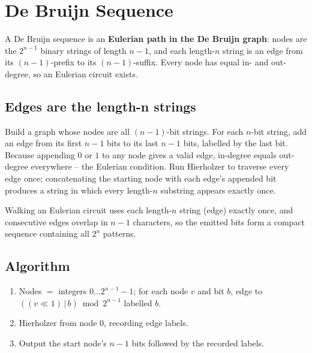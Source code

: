 \section{De Bruijn Sequence}
\label{sec:cses-de-bruijn-sequence}


\begin{patternbox}
A De Bruijn sequence is an \textbf{Eulerian path in the De Bruijn graph}:
nodes are the $2^{n-1}$ binary strings of length $n-1$, and each length-$n$
string is an edge from its $(n-1)$-prefix to its $(n-1)$-suffix. Every node
has equal in- and out-degree, so an Eulerian circuit exists.
\end{patternbox}

\subsection*{Edges are the length-n strings}

Build a graph whose nodes are all $(n-1)$-bit strings. For each $n$-bit
string, add an edge from its first $n-1$ bits to its last $n-1$ bits,
labelled by the last bit. Because appending $0$ or $1$ to any node gives a
valid edge, in-degree equals out-degree everywhere -- the Eulerian
condition. Run Hierholzer to traverse every edge once; concatenating the
starting node with each edge's appended bit produces a string in which every
length-$n$ substring appears exactly once.

\begin{ideabox}
Walking an Eulerian circuit uses each length-$n$ string (edge) exactly once,
and consecutive edges overlap in $n-1$ characters, so the emitted bits form
a compact sequence containing all $2^n$ patterns.
\end{ideabox}

\subsection*{Algorithm}

\begin{enumerate}
  \item Nodes $=$ integers $0\ldots2^{n-1}-1$; for each node $v$ and bit
        $b$, edge to $((v\ll1)\,|\,b)\bmod 2^{n-1}$ labelled $b$.
  \item Hierholzer from node $0$, recording edge labels.
  \item Output the start node's $n-1$ bits followed by the recorded labels.
\end{enumerate}

